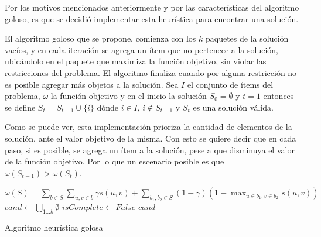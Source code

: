Por los motivos mencionados anteriormente y por las características del algoritmo goloso, es que se decidió implementar esta heurística para encontrar una solución. 

El algoritmo goloso que se propone, comienza con los $k$ paquetes de la solución vacíos, y en cada iteración se agrega un ítem que no pertenece a la solución, ubicándolo en el paquete que maximiza la función objetivo, sin violar las restricciones del problema. El algoritmo finaliza cuando por alguna restricción no es posible agregar más objetos a la solución. Sea $I$ el conjunto de ítems del problema, $\omega$ la función objetivo y en el inicio la solución $S_0 = \emptyset$ y $t=1$ entonces se define $S_t = S_{t-1} \cup \{i\}$ dónde $i \in I$, $i \notin S_{t-1}$ y $S_t$ es una solución válida. 

Como se puede ver, esta implementación prioriza la cantidad de elementos de la solución, ante el valor objetivo de la misma. Con esto se quiere decir que en cada paso, si es posible, se agrega un ítem a la solución, pese a que disminuya el valor de la función objetivo. Por lo que un escenario posible es que $\omega(S_{t-1}) > \omega(S_t)$.

\begin{center}
	\begin{algorithm}[H]
	\DontPrintSemicolon
	\SetAlgoLined
		$\omega(S) = \sum_{b \in S}{\sum_{u,v \in b}{\gamma s(u,v)}} + \sum_{b_1,b_2 \in S}{(1-\gamma) (1-\max_{u \in b_1, v \in b_2}{s(u,v)})}$\;
		$cand \leftarrow \bigcup_{1 \ldots k}\emptyset$\;
		$isComplete \leftarrow False$\;
		\Return $cand$\;
	\caption{Algoritmo heurística golosa}\label{alg:algHeuGol}
	\end{algorithm}
\end{center}

